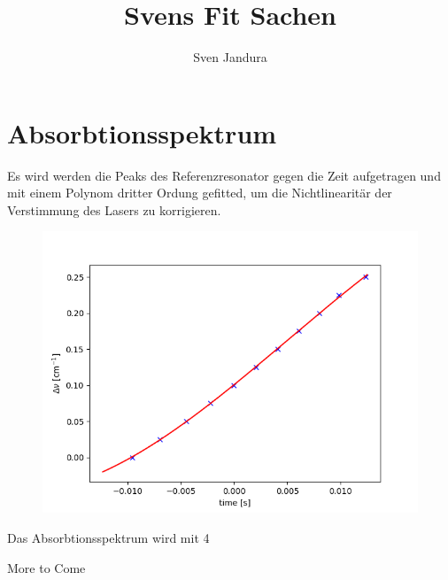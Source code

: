 \documentclass[a4paper,parskip]{scrartcl}
\author{Sven Jandura}
\title{Svens Fit Sachen}
\begin{document}
\maketitle

\tableofcontents

\section{Absorbtionsspektrum}

Es wird werden die Peaks des Referenzresonator gegen die Zeit aufgetragen und mit einem Polynom dritter Ordung gefitted, um die Nichtlinearitär der Verstimmung des Lasers zu korrigieren.

\begin{figure}[h]
\includegraphics[scale = 0.5]{./absorbtion/frequencyCorrection}
\end{figure}

Das Absorbtionsspektrum wird mit 4 


More to Come
\end{document}
